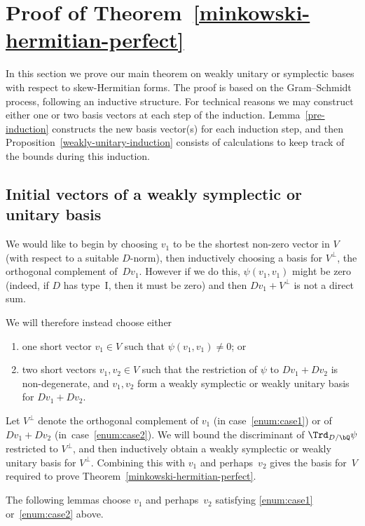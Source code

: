 \section{Proof of Theorem~\ref{minkowski-hermitian-perfect}} \label{sec:minkowski-proof}

In this section we prove our main theorem on weakly unitary or symplectic bases with respect to skew-Hermitian forms.
The proof is based on the Gram--Schmidt process, following an inductive structure.
For technical reasons we may construct either one or two basis vectors at each step of the induction.
Lemma~\ref{pre-induction} constructs the new basis vector(s) for each induction step, and then Proposition~\ref{weakly-unitary-induction} consists of calculations to keep track of the bounds during this induction.

\subsection{Initial vectors of a weakly symplectic or unitary basis}

We would like to begin by choosing $v_1$ to be the shortest non-zero vector in $V$ (with respect to a suitable $D$-norm), then inductively choosing a basis for $V^\perp$, the orthogonal complement of~$Dv_1$.
However if we do this, $\psi(v_1, v_1)$ might be zero (indeed, if $D$ has type~I, then it must be zero) and then $Dv_1 + V^\perp$ is not a direct sum.

We will therefore instead choose either
\begin{enumerate}
\item\label{enum:case1} one short vector $v_1 \in V$ such that $\psi(v_1, v_1) \neq 0$; or
\item\label{enum:case2} two short vectors $v_1, v_2 \in V$ such that the restriction of $\psi$ to $Dv_1 + Dv_2$ is non-degenerate, and $v_1, v_2$ form a weakly symplectic or weakly unitary basis for $Dv_1 + Dv_2$.
\end{enumerate}

Let $V^\perp$ denote the orthogonal complement of $v_1$ (in case~\eqref{enum:case1}) or of $Dv_1 + Dv_2$ (in~case~\eqref{enum:case2}).
We will bound the discriminant of $\Trd_{D/\bQ} \psi$ restricted to $V^\perp$, and then inductively obtain a weakly symplectic or weakly unitary basis for $V^\perp$.
Combining this with $v_1$ and perhaps~$v_2$ gives the basis for~$V$ required to prove Theorem~\ref{minkowski-hermitian-perfect}.

The following lemmas choose $v_1$ and perhaps~$v_2$ satisfying \eqref{enum:case1} or~\eqref{enum:case2} above.

